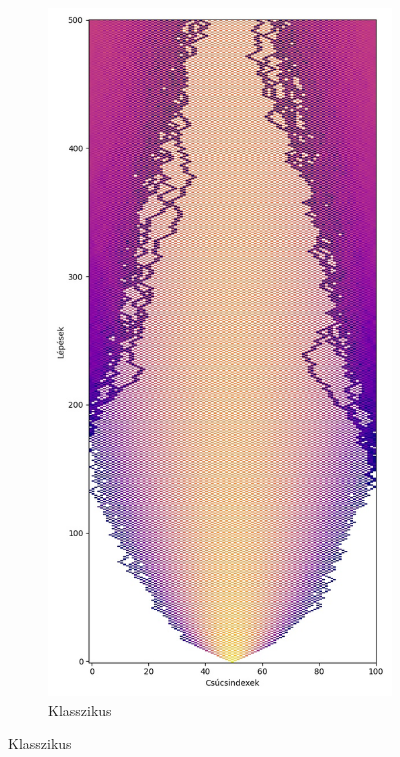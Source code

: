\begin{figure}[H]
  \centering
  \begin{subfigure}{.45\linewidth}
    \centering
    \includegraphics[width=\linewidth]{./figures/quantum/classical_simulation_long.jpg}
    \caption{Klasszikus}

\end{subfigure}
\end{figure}
